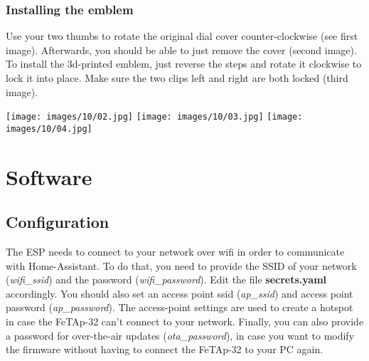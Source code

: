 \documentclass[]{article}
\begin{document}
\subsubsection{Installing the emblem}
\begin{minipage}[t]{0.4\linewidth}
	\vspace{0pt}
	Use your two thumbs to rotate the original dial cover counter-clockwise (see first image).
	\newline
	\newline
	Afterwards, you should be able to just remove the cover (second image).
	\newline
	\newline
	To install the 3d-printed emblem, just reverse the steps and rotate it clockwise to lock it into place. Make sure the two clips left and right are both locked (third image).
\end{minipage}
\hfill
\begin{minipage}[t]{0.4\linewidth}
	\vspace{0pt}
	\texttt{[image: images/10/02.jpg]}
	\texttt{[image: images/10/03.jpg]}
	\texttt{[image: images/10/04.jpg]}
\end{minipage}

\newpage

\section{Software}
\subsection{Configuration}
The ESP needs to connect to your network over wifi in order to communicate with Home-Assistant. To do that, you need to provide the SSID of your network (\textit{wifi\_ssid}) and the password (\textit{wifi\_password}). Edit the file \textbf{secrets.yaml} accordingly. 
\newline
\newline
You should also set an access point ssid (\textit{ap\_ssid}) and access point password (\textit{ap\_password}). The access-point settings are used to create a hotspot in case the FeTAp-32 can't connect to your network. 
\newline
\newline
Finally, you can also provide a password for over-the-air updates (\textit{ota\_password}), in case you want to modify the firmware without having to connect the FeTAp-32 to your PC again.
\end{document}
